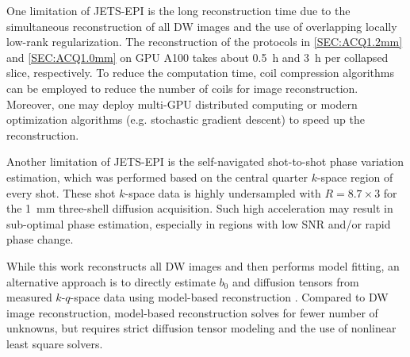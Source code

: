 \documentclass[preprint,12pt,authoryear,review]{elsarticle}
\begin{document}
	One limitation of JETS-EPI is the long reconstruction time
	due to the simultaneous reconstruction of all DW images and
	the use of overlapping locally low-rank regularization.
        The reconstruction of the protocols in \cref{SEC:ACQ1.2mm} and \cref{SEC:ACQ1.0mm}
        on GPU A100 takes about \SI{0.5}{\hour} and \SI{3}{\hour} per collapsed slice, respectively.
        To reduce the computation time, coil compression algorithms \citep{huang_2008_scc}
        can be employed to reduce the number of coils for image reconstruction.
        Moreover, one may deploy multi-GPU distributed computing or modern optimization algorithms
        (e.g. stochastic gradient descent) \citep{ong_2020_extreme} to speed up the reconstruction.

        Another limitation of JETS-EPI is the self-navigated shot-to-shot phase variation estimation,
        which was performed based on the central quarter $k$-space region of every shot.
        These shot $k$-space data is highly undersampled with $R = 8.7 \times 3$
        for the \SI{1}{mm} three-shell diffusion acquisition.
        Such high acceleration may result in sub-optimal phase estimation,
        especially in regions with low SNR and/or rapid phase change.

        While this work reconstructs all DW images and then performs model fitting,
        an alternative approach is to directly estimate $b_0$ and diffusion tensors
        from measured $k$-$q$-space data using model-based reconstruction
        \citep{knoll_2015_mobadiff,dong_2018_mobadiff,shafieizargar_2023_adept}.
        Compared to DW image reconstruction,
        model-based reconstruction solves for fewer number of unknowns,
        but requires strict diffusion tensor modeling and the use of nonlinear least square solvers.



\end{document}
